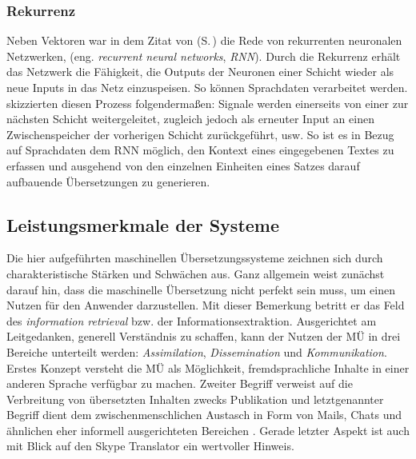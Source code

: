 \subsubsection{Rekurrenz}

Neben Vektoren war in dem Zitat von \citeauthor{bahdanau_neural_2017} (S.\,\pageref{K3:quote-vektoren}) die Rede von rekurrenten neuronalen Netzwerken, (eng. \emph{recurrent neural networks}, \emph{RNN}). Durch die Rekurrenz erhält das Netzwerk die Fähigkeit, \glqq die Outputs der Neuronen einer Schicht wieder als neue Inputs in das Netz\grqq{} \citep[41]{kruger_von_2017} einzuspeisen. So können Sprachdaten verarbeitet werden. \citet{cattelan_introduction_2017} skizzierten diesen Prozess folgendermaßen: Signale werden einerseits von einer zur nächsten Schicht weitergeleitet, zugleich jedoch als erneuter Input an einen Zwischenspeicher der vorherigen Schicht zurückgeführt, usw.
So ist es in Bezug auf Sprachdaten dem RNN möglich, den Kontext eines eingegebenen Textes zu erfassen und ausgehend von den einzelnen Einheiten eines Satzes darauf aufbauende Übersetzungen zu generieren.



\subsection{Leistungsmerkmale der Systeme}\label{K3:subsec:LeistungSystemeMT}

\begin{sloppypar}
Die hier aufgeführten maschinellen Übersetzungssysteme zeichnen sich durch charakteristische Stärken und Schwächen aus. Ganz allgemein weist \citet[20]{koehn_statistical_2009} zunächst darauf hin, dass die maschinelle Übersetzung nicht perfekt sein muss, um einen Nutzen für den Anwender darzustellen. Mit dieser Bemerkung betritt er das Feld des \emph{information retrieval} bzw. der Informationsextraktion. Ausgerichtet am Leitgedanken, generell Verständnis zu schaffen, kann der Nutzen der MÜ in drei Bereiche unterteilt werden: \emph{Assimilation}, \emph{Dissemination} und \emph{Kommunikation}. Erstes Konzept versteht die MÜ als Möglichkeit, fremdsprachliche Inhalte in einer anderen Sprache verfügbar zu machen. Zweiter Begriff verweist auf die Verbreitung von übersetzten Inhalten zwecks Publikation und letztgenannter Begriff dient dem zwischenmenschlichen Austasch in Form von Mails, Chats und ähnlichen eher informell ausgerichteten Bereichen \citep[20]{koehn_statistical_2009}. Gerade letzter Aspekt ist auch mit Blick auf den Skype Translator ein wertvoller Hinweis.
\end{sloppypar}


